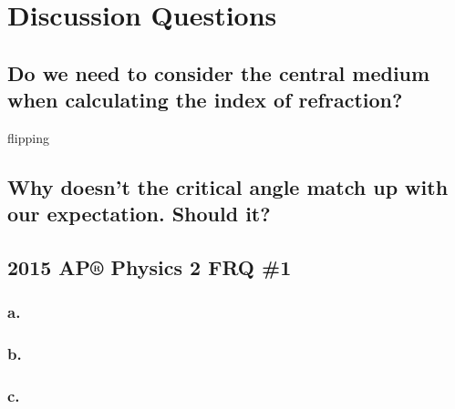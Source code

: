 \documentclass{elegantpaper}
\begin{document}
\section{Discussion Questions}
\subsection{Do we need to consider the central medium when calculating the index of refraction?}flipping 
\subsection{Why doesn't the critical angle match up with our expectation. Should it?}
\subsection{2015 AP® Physics 2 FRQ \#1}
\subsubsection*{a.}
\subsubsection*{b.}
\subsubsection*{c.}
\end{document}
